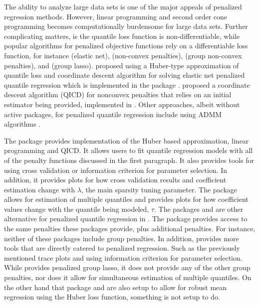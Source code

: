 \documentclass[article]{rqPenVignette}%
\begin{document}
The ability to analyze large data sets is one of the major appeals of penalized regression methods. However, linear programming and second order cone programming becomes computationally burdensome for large data sets. Further complicating matters, is the quantile loss function is non-differentiable, while popular algorithms for penalized objective functions rely on a differentiable loss function, for instance \cite{friedman2009glmnet} (elastic net), \cite{scadAlg} (non-convex penalties), \cite{brehenyglasso} (group non-convex penalties),  and \cite{Yang2015} (group lasso). \cite{huber_cd} proposed using a Huber-type approximation of quantile loss and coordinate descent algorithm for solving elastic net penalized quantile regression which is implemented in the  package . \cite{qr_cd} proposed a coordinate descent algorithm (QICD) for nonconvex penalties that relies on an initial estimator being provided, implemented in . Other approaches, albeit without active  packages, for penalized quantile regression include using ADMM algorithms \citep{admm_nan_qr,lan_admm, admm_hui}. %

The package  provides implementation of the Huber based approximation, linear programming and QICD. It allows users to fit quantile regression models with all of the penalty functions discussed in the first paragraph. It also provides tools for using cross validation or information criterion for parameter selection. In addition, it provides plots for how cross validation results and coefficient estimation change with $\lambda$, the main sparsity tuning parameter. The package allows for estimation of multiple quantiles and provides plots for how coefficient values change with the quantile being modeled, $\tau$. The packages  and  are other alternative for penalized quantile regression in . The package  provides access to the same penalties these packages provide, plus additional penalties. For instance, neither of these packages include group penalties. In addition,  provides more tools that are directly catered to penalized regression. Such as the previously mentioned trace plots and using information criterion for parameter selection.   While  provides penalized group lasso, it does not provide any of the other group penalties, nor does it allow for simultaneous estimation of multiple quantiles. On the other hand that package and  are also setup to allow for robust mean regression using the Huber loss function, something  is not setup to do. 
\end{document}
